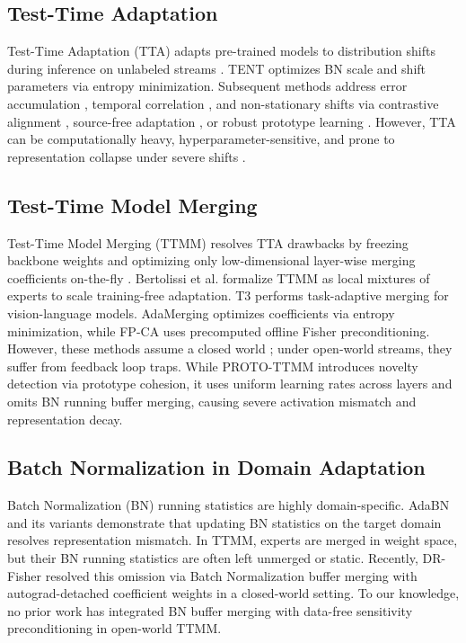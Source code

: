 \documentclass{article}
\theoremstyle{plain}
\theoremstyle{definition}
\theoremstyle{remark}
\begin{document}
\subsection{Test-Time Adaptation}
Test-Time Adaptation (TTA) adapts pre-trained models to distribution shifts during inference on unlabeled streams \cite{liang2023comprehensive, boudiaf2022parameterfree}. TENT \cite{wang2021tent} optimizes BN scale and shift parameters via entropy minimization. Subsequent methods address error accumulation \cite{gong2022note}, temporal correlation \cite{song2023ecotta}, and non-stationary shifts \cite{niu2023towards} via contrastive alignment \cite{chen2022contrastive}, source-free adaptation \cite{bhardwaj2022unsupervised}, or robust prototype learning \cite{luo2026protodcs, raichle2025testtime}. However, TTA can be computationally heavy, hyperparameter-sensitive, and prone to representation collapse under severe shifts \cite{lim2023ttn, zhao2025dmposa}.

\subsection{Test-Time Model Merging}
Test-Time Model Merging (TTMM) resolves TTA drawbacks by freezing backbone weights and optimizing only low-dimensional layer-wise merging coefficients on-the-fly \cite{yang2024adamerging, zhao2024}. Bertolissi et al. \cite{bertolissi2025local} formalize TTMM as local mixtures of experts to scale training-free adaptation. T3 \cite{t3_model_merging_2024} performs task-adaptive merging for vision-language models. AdaMerging \cite{yang2024adamerging} optimizes coefficients via entropy minimization, while FP-CA \cite{fp_ow_2026} uses precomputed offline Fisher preconditioning. However, these methods assume a closed world \cite{luan2026}; under open-world streams, they suffer from feedback loop traps. While PROTO-TTMM \cite{igg_ow_2026} introduces novelty detection via prototype cohesion, it uses uniform learning rates across layers and omits BN running buffer merging, causing severe activation mismatch and representation decay.

\subsection{Batch Normalization in Domain Adaptation}
Batch Normalization (BN) running statistics are highly domain-specific. AdaBN \cite{li2016revisiting} and its variants \cite{li2018adaptive, chang2019domainspecific} demonstrate that updating BN statistics on the target domain resolves representation mismatch. In TTMM, experts are merged in weight space, but their BN running statistics are often left unmerged or static. Recently, DR-Fisher \cite{dr_fisher_2026} resolved this omission via Batch Normalization buffer merging with autograd-detached coefficient weights in a closed-world setting. To our knowledge, no prior work has integrated BN buffer merging with data-free sensitivity preconditioning in open-world TTMM.
\end{document}
